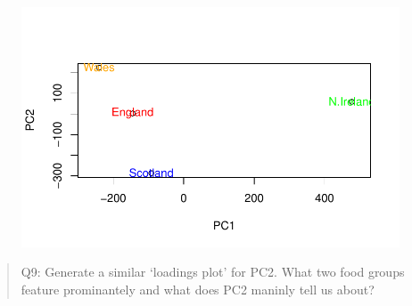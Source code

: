 \documentclass[
  letterpaper,
  DIV=11,
  numbers=noendperiod]{scrartcl}
\begin{document}
\begin{figure}[H]

{\centering \includegraphics{Class07_files/figure-pdf/unnamed-chunk-22-1.pdf}

}

\end{figure}

\begin{quote}
Q9: Generate a similar `loadings plot' for PC2. What two food groups
feature prominantely and what does PC2 maninly tell us about?
\end{quote}
\end{document}
